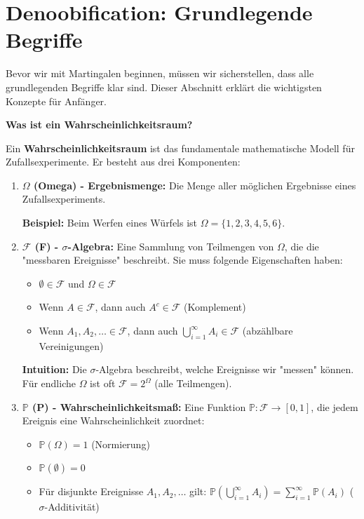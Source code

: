 \vspace{1cm}


\section{Denoobification: Grundlegende Begriffe}

Bevor wir mit Martingalen beginnen, müssen wir sicherstellen, dass alle grundlegenden Begriffe klar sind. Dieser Abschnitt erklärt die wichtigsten Konzepte für Anfänger.

\begin{denoobification}[Wahrscheinlichkeitsraum]
\textbf{Was ist ein Wahrscheinlichkeitsraum?}

Ein \textbf{Wahrscheinlichkeitsraum} ist das fundamentale mathematische Modell für Zufallsexperimente. Er besteht aus drei Komponenten:

\begin{enumerate}
    \item \textbf{$\Omega$ (Omega) - Ergebnismenge:} Die Menge aller möglichen Ergebnisse eines Zufallsexperiments.
    
    \textbf{Beispiel:} Beim Werfen eines Würfels ist $\Omega = \{1, 2, 3, 4, 5, 6\}$.
    
    \item \textbf{$\mathcal{F}$ (F) - $\sigma$-Algebra:} Eine Sammlung von Teilmengen von $\Omega$, die die "messbaren Ereignisse" beschreibt. Sie muss folgende Eigenschaften haben:
    \begin{itemize}
        \item $\emptyset \in \mathcal{F}$ und $\Omega \in \mathcal{F}$
        \item Wenn $A \in \mathcal{F}$, dann auch $A^c \in \mathcal{F}$ (Komplement)
        \item Wenn $A_1, A_2, \ldots \in \mathcal{F}$, dann auch $\bigcup_{i=1}^{\infty} A_i \in \mathcal{F}$ (abzählbare Vereinigungen)
    \end{itemize}
    
    \textbf{Intuition:} Die $\sigma$-Algebra beschreibt, welche Ereignisse wir "messen" können. Für endliche $\Omega$ ist oft $\mathcal{F} = 2^{\Omega}$ (alle Teilmengen).
    
    \item \textbf{$\mathbb{P}$ (P) - Wahrscheinlichkeitsmaß:} Eine Funktion $\mathbb{P}: \mathcal{F} \to [0,1]$, die jedem Ereignis eine Wahrscheinlichkeit zuordnet:
    \begin{itemize}
        \item $\mathbb{P}(\Omega) = 1$ (Normierung)
        \item $\mathbb{P}(\emptyset) = 0$
        \item Für disjunkte Ereignisse $A_1, A_2, \ldots$ gilt: $\mathbb{P}\left(\bigcup_{i=1}^{\infty} A_i\right) = \sum_{i=1}^{\infty} \mathbb{P}(A_i)$ ($\sigma$-Additivität)
    \end{itemize}
\end{enumerate}


\end{denoobification}
